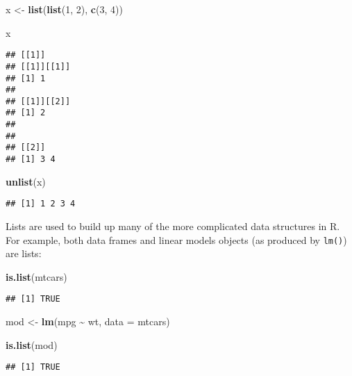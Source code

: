 \documentclass[
]{book}
\newenvironment{Shaded}{\begin{snugshade}}{\end{snugshade}}
\newcommand{\DataTypeTok}[1]{\textcolor[rgb]{0.13,0.29,0.53}{#1}}
\newcommand{\DecValTok}[1]{\textcolor[rgb]{0.00,0.00,0.81}{#1}}
\newcommand{\KeywordTok}[1]{\textcolor[rgb]{0.13,0.29,0.53}{\textbf{#1}}}
\newcommand{\NormalTok}[1]{#1}
\newcommand{\OperatorTok}[1]{\textcolor[rgb]{0.81,0.36,0.00}{\textbf{#1}}}
\newcommand{\StringTok}[1]{\textcolor[rgb]{0.31,0.60,0.02}{#1}}
\begin{document}
\begin{Shaded}
\begin{Highlighting}[]
\NormalTok{x \textless{}{-}}\StringTok{ }\KeywordTok{list}\NormalTok{(}\KeywordTok{list}\NormalTok{(}\DecValTok{1}\NormalTok{, }\DecValTok{2}\NormalTok{), }\KeywordTok{c}\NormalTok{(}\DecValTok{3}\NormalTok{, }\DecValTok{4}\NormalTok{))}

\NormalTok{x}
\end{Highlighting}
\end{Shaded}

\begin{verbatim}
## [[1]]
## [[1]][[1]]
## [1] 1
## 
## [[1]][[2]]
## [1] 2
## 
## 
## [[2]]
## [1] 3 4
\end{verbatim}

\begin{Shaded}
\begin{Highlighting}[]
\KeywordTok{unlist}\NormalTok{(x)}
\end{Highlighting}
\end{Shaded}

\begin{verbatim}
## [1] 1 2 3 4
\end{verbatim}

Lists are used to build up many of the more complicated data structures in R. For example, both data frames and linear models objects (as produced by \texttt{lm()}) are lists:

\begin{Shaded}
\begin{Highlighting}[]
\KeywordTok{is.list}\NormalTok{(mtcars)}
\end{Highlighting}
\end{Shaded}

\begin{verbatim}
## [1] TRUE
\end{verbatim}

\begin{Shaded}
\begin{Highlighting}[]
\NormalTok{mod \textless{}{-}}\StringTok{ }\KeywordTok{lm}\NormalTok{(mpg }\OperatorTok{\textasciitilde{}}\StringTok{ }\NormalTok{wt, }\DataTypeTok{data =}\NormalTok{ mtcars)}

\KeywordTok{is.list}\NormalTok{(mod)}
\end{Highlighting}
\end{Shaded}

\begin{verbatim}
## [1] TRUE
\end{verbatim}
\end{document}
